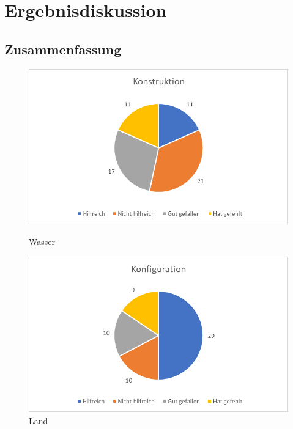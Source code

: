 \chapter{Ergebnisdiskussion}
\label{ch:Results}

\section{Zusammenfassung}


\begin{figure}
   \begin{minipage}[b]{.49\linewidth} %
      \includegraphics[width=\linewidth]{pictures/diagramme/aussagenkonstr}
      \caption{Wasser}
   \end{minipage}
   \hspace{.01\linewidth}%
   \begin{minipage}[b]{.49\linewidth} %
      \includegraphics[width=\linewidth]{pictures/diagramme/aussagenkonfig}
      \caption{Land}
   \end{minipage}
\end{figure}

